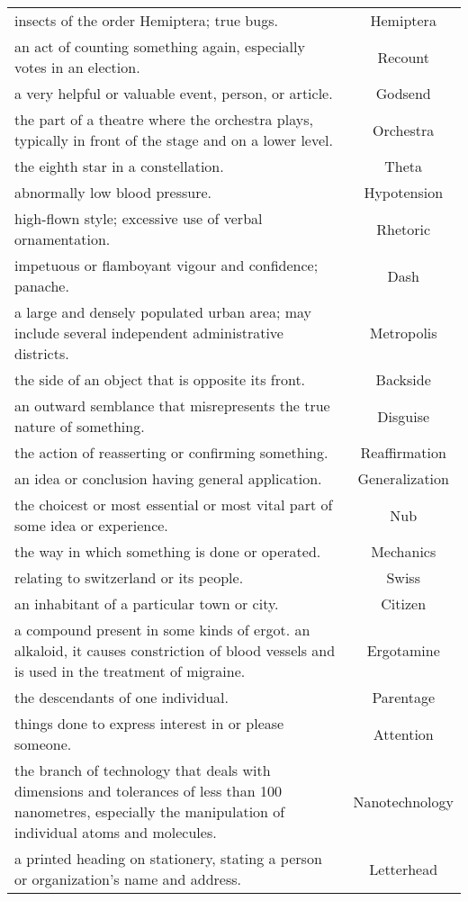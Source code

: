 \begin{longtable}{p{12cm}c}
insects of the order Hemiptera; true bugs. & Hemiptera\\
an act of counting something again, especially votes in an election. & Recount\\
a very helpful or valuable event, person, or article. & Godsend\\
the part of a theatre where the orchestra plays, typically in front of the stage and on a lower level. & Orchestra\\
the eighth star in a constellation. & Theta\\
abnormally low blood pressure. & Hypotension\\
high-flown style; excessive use of verbal ornamentation. & Rhetoric\\
impetuous or flamboyant vigour and confidence; panache. & Dash\\
a large and densely populated urban area; may include several independent administrative districts. & Metropolis\\
the side of an object that is opposite its front. & Backside\\
an outward semblance that misrepresents the true nature of something. & Disguise\\
the action of reasserting or confirming something. & Reaffirmation\\
an idea or conclusion having general application. & Generalization\\
the choicest or most essential or most vital part of some idea or experience. & Nub\\
the way in which something is done or operated. & Mechanics\\
relating to switzerland or its people. & Swiss\\
an inhabitant of a particular town or city. & Citizen\\
a compound present in some kinds of ergot. an alkaloid, it causes constriction of blood vessels and is used in the treatment of migraine. & Ergotamine\\
the descendants of one individual. & Parentage\\
things done to express interest in or please someone. & Attention\\
the branch of technology that deals with dimensions and tolerances of less than 100 nanometres, especially the manipulation of individual atoms and molecules. & Nanotechnology\\
a printed heading on stationery, stating a person or organization's name and address. & Letterhead\\

\end{longtable}
